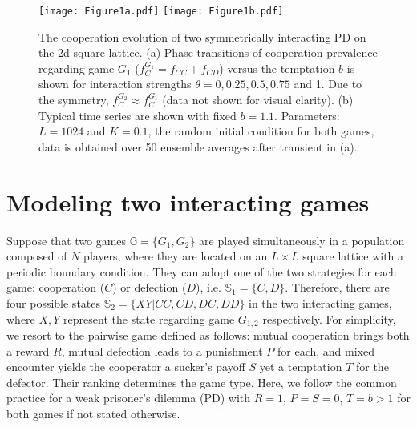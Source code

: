 \documentclass[doublecol]{epl2}
\begin{document}
\begin{figure}
\centering
\texttt{[image: Figure1a.pdf]}
\texttt{[image: Figure1b.pdf]}
\caption{
The cooperation evolution of two symmetrically interacting PD on the 2d square lattice.
(a) Phase transitions of cooperation prevalence regarding game $G_1$ ($f^{G_1}_C=f_{CC}+f_{CD}$) versus the temptation $b$ is shown for interaction strengths $\theta=0,0.25,0.5, 0.75$ and 1. Due to the symmetry, $f^{G_2}_C\approx f^{G_1}_C$ (data not shown for visual clarity).
(b) Typical time series are shown with fixed $b=1.1$. Parameters: $L=1024$ and $K=0.1$, the random initial condition for both games, data is obtained over 50 ensemble averages after transient in (a).
}
\label{fig:PT}
\end{figure}

\section{Modeling two interacting games}
Suppose that two games $\mathbb{G}\!=\!\{G_1, G_2\}$ are played simultaneously in a population composed of $N$ players, where they are located on an $L\times L$ square lattice with a periodic boundary condition. They can adopt one of the two strategies for each game: cooperation ($C$) or defection ($D$), i.e. $\mathbb{S}_1=\{C,D\}$. Therefore, there are four possible states $\mathbb{S}_2=\{XY|CC, CD, DC, DD\}$ in the two interacting games, where $X,Y$ represent the state regarding game $G_{1,2}$ respectively. For simplicity, we resort to the pairwise game defined as follows: mutual cooperation brings both a reward $R$, mutual defection leads to a punishment $P$ for each, and mixed encounter yields the cooperator a sucker's payoff $S$ yet a temptation $T$ for the defector. Their ranking determines the game type.
Here, we follow the common practice for a weak prisoner's dilemma (PD) with $R=1$, $P=S=0$, $T=b>1$ for both games if not stated otherwise.
\end{document}
